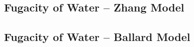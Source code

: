 \subsection{Fugacity of Water -- Zhang Model}\label{Chapter:Hydrate:Section:HydrateModels:Section:FugacityWaterZhang}

\subsection{Fugacity of Water -- Ballard Model}\label{Chapter:Hydrate:Section:HydrateModels:Section:FugacityWaterBallard}
